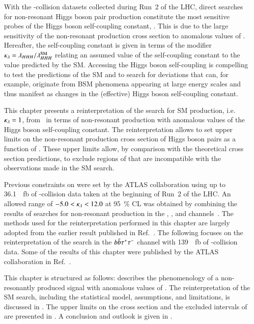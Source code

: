 With the \pp-collision datasets collected during Run~2 of the LHC,
direct searches for non-resonant Higgs boson pair production
constitute the most sensitive probes of the Higgs boson self-coupling
constant, \lambdahhh. This is due to the large sensitivity of the
non-resonant \HH production cross section to anomalous values of
\lambdahhh. Hereafter, the self-coupling constant is given in terms of
the modifier $\kappa_{\lambda} = \lambda_{HHH} / \lambda_{HHH}^{\text{SM}}$ relating
an assumed value of the self-coupling constant to the value predicted
by the SM. Accessing the Higgs boson self-coupling is compelling to
test the predictions of the SM and to search for deviations that can,
for example, originate from BSM phenomena appearing at large energy
scales and thus manifest as changes in the (effective) Higgs boson
self-coupling constant.

This chapter presents a reinterpretation of the search for SM \HH production,
i.e.\ $\kappa_{\lambda} = 1$, from~ in terms of non-resonant \HH
production with anomalous values of the Higgs boson self-coupling constant. The
reinterpretation allows to set upper limits on the non-resonant production cross
section of Higgs boson pairs as a function of \klambda. These upper limits
allow, by comparison with the theoretical cross section predictions, to exclude
regions of \klambda that are incompatible with the observations made in the SM
\HH search.

Previous constraints on \klambda were set by the ATLAS collaboration using up to
\SI{36.1}{\per\femto\barn} of \pp-collision data taken at the beginning of Run~2
of the LHC. An allowed range of $-5.0 < \kappa_{\lambda} < 12.0$ at \SI{95}{\percent} CL
was obtained by combining the results of searches for non-resonant \HH
production in the \bbtautau, \bbbb, and \bbyy channels~\cite{HDBS-2018-58}. The
methods used for the reinterpretation performed in this chapter are largely
adopted from the earlier result published in Ref.~\cite{HDBS-2018-58}. The
following focuses on the reinterpretation of the search in the $b\bar{b}\tau^{+} \tau^{-}$
channel with \SI{139}{\per\femto\barn} of \pp-collision data. Some of the
results of this chapter were published by the ATLAS collaboration in
Ref.~\cite{ATLAS-CONF-2021-052}.

This chapter is structured as follows: 
describes the phenomenology of a non-resonantly produced \HH signal
with anomalous values of \klambda. The reinterpretation of the SM \HH
search, including the statistical model, assumptions, and limitations,
is discussed in . The upper limits on the
cross section and the excluded intervals of \klambda are presented in
. A conclusion and outlook is given
in .


